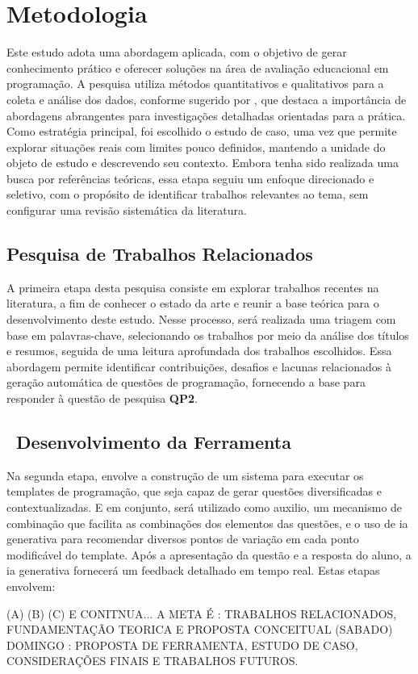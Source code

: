 \chapter{Metodologia}\label{cap:metodologia}

Este estudo adota uma abordagem aplicada, com o objetivo de gerar conhecimento prático e oferecer soluções na área de avaliação educacional em programação. A pesquisa utiliza métodos quantitativos e qualitativos para a coleta e análise dos dados, conforme sugerido por \parencite{Gil2017}, que destaca a importância de abordagens abrangentes para investigações detalhadas orientadas para a prática. Como estratégia principal, foi escolhido o estudo de caso, uma vez que permite explorar situações reais com limites pouco definidos, mantendo a unidade do objeto de estudo e descrevendo seu contexto. Embora tenha sido realizada uma busca por referências teóricas, essa etapa seguiu um enfoque direcionado e seletivo, com o propósito de identificar trabalhos relevantes ao tema, sem configurar uma revisão sistemática da literatura. 

\section{Pesquisa de Trabalhos Relacionados}

A primeira etapa desta pesquisa consiste em explorar trabalhos recentes na literatura, a fim de conhecer o estado da arte e reunir a base teórica para o desenvolvimento deste estudo. Nesse processo, será realizada uma triagem com base em palavras-chave, selecionando os trabalhos por meio da análise dos títulos e resumos, seguida de uma leitura aprofundada dos trabalhos escolhidos. Essa abordagem permite identificar contribuições, desafios e lacunas relacionados à geração automática de questões de programação, fornecendo a base para responder à questão de pesquisa \textbf{QP2}. 


\section{\textbf{ Desenvolvimento da Ferramenta} }
Na segunda etapa, envolve a construção de um sistema para executar os templates de programação, que seja capaz de gerar questões diversificadas e contextualizadas. E em conjunto, será utilizado como auxilio, um mecanismo de combinação que facilita as combinações dos elementos das questões, e o uso de \gls{ia} generativa para recomendar diversos pontos de variação em cada ponto modificável do template. Após a apresentação da questão e a resposta do aluno, a \gls{ia}  generativa fornecerá um feedback detalhado em tempo real. Estas etapas envolvem: 

(A)
(B)
(C)
E CONITNUA...
A META É : TRABALHOS RELACIONADOS, FUNDAMENTAÇÃO TEORICA E PROPOSTA CONCEITUAL (SABADO)
DOMINGO : PROPOSTA DE FERRAMENTA, ESTUDO DE CASO, CONSIDERAÇÕES FINAIS E TRABALHOS FUTUROS.